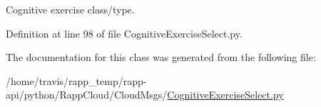Cognitive exercise class/type. 



Definition at line 98 of file Cognitive\-Exercise\-Select.\-py.



The documentation for this class was generated from the following file\-:\begin{DoxyCompactItemize}
\item 
/home/travis/rapp\-\_\-temp/rapp-\/api/python/\-Rapp\-Cloud/\-Cloud\-Msgs/\hyperlink{CognitiveExerciseSelect_8py}{Cognitive\-Exercise\-Select.\-py}\end{DoxyCompactItemize}
